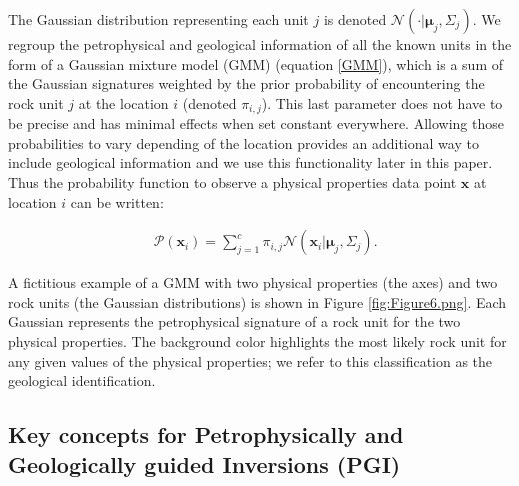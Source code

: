 \documentclass[paper, twocolumn]{geophysics} %
\begin{document}
The Gaussian distribution representing each unit $j$ is denoted $\mathcal{N}(\cdot | \mathbf{\mu}_j, \Sigma_j)$. We regroup the petrophysical and geological information of all the known units in the form of a Gaussian mixture model (GMM) (equation \ref{GMM}), which is a sum of the Gaussian signatures weighted by the prior probability of encountering the rock unit $j$ at the location $i$ (denoted $\pi_{i,j}$). This last parameter does not have to be precise and has minimal effects when set constant everywhere. Allowing those probabilities to vary depending of the location provides an additional way to include geological information \citep{Giraud2017} and we use this functionality later in this paper. Thus the probability function to observe a physical properties data point $\mathbf{x}$ at location $i$ can be written:

\begin{align}
&\mathcal{P}(\mathbf{x}_i) = \sum_{j=1}^c \pi_{i,j} \mathcal{N}(\mathbf{x}_i|\mathbf{\mu}_j,\Sigma_j). \label{GMM}
\end{align}

A fictitious example of a GMM with two physical properties (the axes) and two rock units (the Gaussian distributions) is shown in Figure \ref{fig:Figure6.png}. Each Gaussian represents the petrophysical signature of a rock unit for the two physical properties. The background color highlights the most likely rock unit for any given values of the physical properties; we refer to this classification as the geological identification.



\subsection{Key concepts for Petrophysically and Geologically guided Inversions (PGI)}
\end{document}
